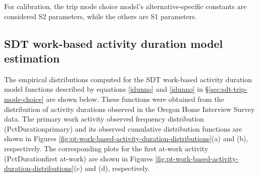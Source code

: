 For calibration, the trip mode choice model's alternative-specific constants are considered S2 parameters, while the others are S1 parameters. 

 
\subsection{SDT work-based activity duration model estimation}
The empirical distributions computed for the SDT work-based activity duration model functions described by equations \ref{idunno} and \ref{idunno} in \S\ref{sec:sdt-trip-mode-choice} are shown below. These functions were obtained from the distribution of activity durations observed in the Oregon Home Interview Survey data. The primary work activity observed frequency distribution (PctDurationprimary) and its observed cumulative distribution functions are shown in Figures \ref{fig:pt-work-based-activity-duration-distributions}(a) and (b), respectively. The corresponding plots for the first at-work activity (PctDurationfirst at-work) are shown in Figures \ref{fig:pt-work-based-activity-duration-distributions}(c) and (d), respectively. 

